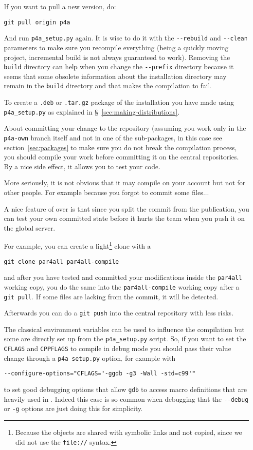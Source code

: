 \documentclass[a4paper]{article}
\begin{document}
If you want to pull a new version, do:
\begin{verbatim}
git pull origin p4a
\end{verbatim}

And run \verb|p4a_setup.py| again. It is wise to do it with the
\verb|--rebuild| and \verb|--clean| parameters to make sure you recompile
everything (\Apips being a quickly moving project, incremental build is
not always guaranteed to work). Removing the \texttt{build} directory can
help when you change the \verb|--prefix| directory because it seems that
some obsolete information about the installation directory may remain in
the \texttt{build} directory and that makes the compilation to fail.

To create a \texttt{.deb} or \texttt{.tar.gz} package of the installation
you have made using \verb|p4a_setup.py| as explained in
\S~\ref{sec:making-distributions}.

About committing your change to the \Agit repository (assuming you work
only in the \texttt{p4a-own} branch itself and not in one of the \Apfa
sub-packages, in this case see section~\ref{sec:packages} to make sure you
do not break the compilation process, you should compile your work before
committing it on the central repositories. By a nice side effect, it
allows you to test your code. \smiley

More seriously, it is not obvious that it may compile on your account but
not for other people. For example because you forgot to commit some
files...

A nice feature of \Agit over \Asvn is that since you split the commit from
the publication, you can test your own committed state before it hurts the
team when you push it on the global server.

For example, you can create a light\footnote{Because the objects are
  shared with symbolic links and not copied, since we did not use the
  \texttt{file://} syntax.} clone with a
\begin{verbatim}
git clone par4all par4all-compile
\end{verbatim}
and after you have tested and committed your modifications inside the
\texttt{par4all} working copy, you do the same into the
\texttt{par4all-compile} working copy after a \texttt{git pull}.
If some files are lacking from the commit, it will be detected.

Afterwards you can do a \texttt{git push} into the central \Apfa
repository with less risks.

The classical \Aautotools environment variables can be used to influence
the compilation but some are directly set up from the \verb|p4a_setup.py|
script. So, if you want to set the \texttt{CFLAGS} and \texttt{CPPFLAGS}
to compile \Apfa in debug mode you should pass their value change through
a \verb|p4a_setup.py| option, for example with
\begin{verbatim}
--configure-options="CFLAGS='-ggdb -g3 -Wall -std=c99'"
\end{verbatim}
to set good debugging options that allow \texttt{gdb} to access macro
definitions that are heavily used in \Apips. Indeed this case is so common
when debugging \Apfa that the \verb|--debug| or \verb|-g| options are just
doing this for simplicity.
\end{document}

